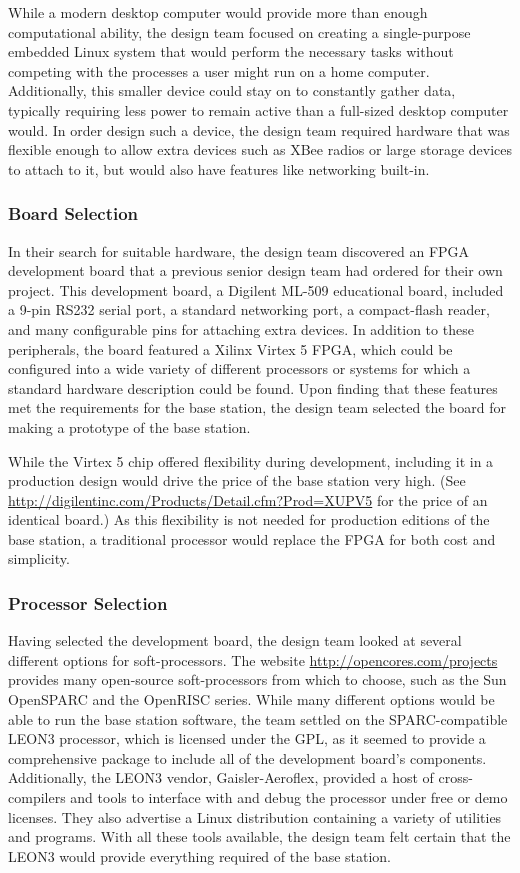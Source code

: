 While a modern desktop computer would provide more than enough
computational ability, the design team focused on creating a single-purpose
embedded Linux system that would perform the necessary tasks without
competing with the processes a user might run on a home
computer. Additionally, this smaller device could stay on to constantly
gather data, typically requiring less power to remain active than a
full-sized desktop computer would. In order design such a device, the
design team required hardware that was flexible enough to allow extra
devices such as XBee radios or large storage devices to attach to it, but
would also have features like networking built-in.

\subsubsection{Board Selection}
In their search for suitable hardware, the design team discovered an
\ac{FPGA} development board that a previous senior design team had ordered
for their own project. This development board, a Digilent ML-509
educational board,  included a 9-pin \ac{RS232} serial port, a standard
networking port, a compact-flash reader, and many configurable pins for
attaching extra devices. In addition to these peripherals, the board
featured a Xilinx Virtex 5 \ac{FPGA}, which could be configured into a wide
variety of different processors or systems for which a standard hardware
description could be found. Upon finding that these features met the
requirements for the base station, the design team selected the board for
making a prototype of the base station.

While the Virtex 5 chip offered flexibility during development, including
it in a production design would drive the price of the base station very
high. (See \url{http://digilentinc.com/Products/Detail.cfm?Prod=XUPV5} for
the price of an identical board.)  As this flexibility is not needed for
production editions of the base station, a traditional processor would
replace the \ac{FPGA} for both cost and simplicity.

\subsubsection{Processor Selection}
Having selected the development board, the design team looked at several
different options for soft-processors. The website
\url{http://opencores.com/projects} provides many open-source
soft-processors from which to choose, such as the
Sun OpenSPARC and the OpenRISC series. While many different options would
be able to run the base station software, the team settled on the
SPARC-compatible LEON3 processor, which is licensed under the \ac{GPL}, as 
it seemed to provide a comprehensive package to include all of the
development board's components. Additionally, the LEON3 vendor,
Gaisler-Aeroflex, provided a host of cross-compilers and tools to interface
with and debug the processor under free or demo licenses. They also
advertise a Linux distribution containing a variety of utilities and
programs. With all these tools available, the design team felt certain that
the LEON3 would provide everything required of the base station.

